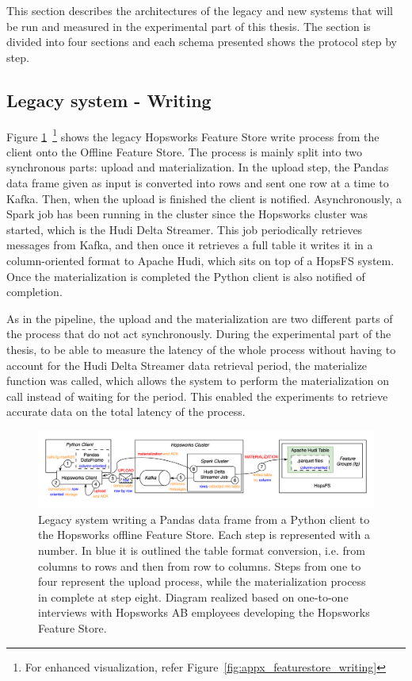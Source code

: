 This section describes the architectures of the legacy and new systems that will be run and measured in the experimental part of this thesis. The section is divided into four sections and each schema presented shows the protocol step by step.

\subsection{Legacy system - Writing}
\label{subsec:legacy_sys_writing}

Figure \ref{fig:featurestore_writing}~\footnote{For enhanced visualization, refer Figure~\ref{fig:appx_featurestore_writing}} shows the legacy Hopsworks Feature Store write process from the client onto the Offline Feature Store. The process is mainly split into two synchronous parts: upload and materialization. In the upload step, the Pandas data frame given as input is converted into rows and sent one row at a time to Kafka. Then, when the upload is finished the client is notified. Asynchronously, a Spark job has been running in the cluster since the Hopsworks cluster was started, which is the Hudi Delta Streamer. This job periodically retrieves messages from Kafka, and then once it retrieves a full table it writes it in a column-oriented format to Apache Hudi, which sits on top of a \gls{HopsFS} system. Once the materialization is completed the Python client is also notified of completion.

As in the pipeline, the upload and the materialization are two different parts of the process that do not act synchronously. During the experimental part of the thesis, to be able to measure the latency of the whole process without having to account for the Hudi Delta Streamer data retrieval period, the materialize function was called, which allows the system to perform the materialization on call instead of waiting for the period. This enabled the experiments to retrieve accurate data on the total latency of the process.

\begin{figure}
    \begin{center}
      \includegraphics[width=\textwidth]{figures/2-background/FeatureStore-writing.png}
    \end{center}
    \caption[Legacy system - Write process]{Legacy system writing a Pandas data frame from a Python client to the Hopsworks offline Feature Store. Each step is represented with a number. In blue it is outlined the table format conversion, i.e. from columns to rows and then from row to columns. Steps from one to four represent the upload process, while the materialization process in complete at step eight. Diagram realized based on one-to-one interviews with Hopsworks AB employees developing the Hopsworks Feature Store.}
    \label{fig:featurestore_writing}
\end{figure}

